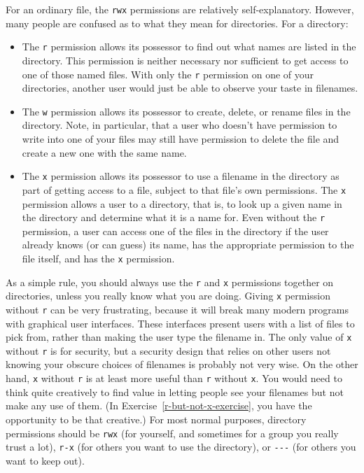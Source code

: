 For an ordinary file, the \texttt{rwx} permissions are relatively
self-explanatory.  However, many people are confused as to what they mean
for directories.  For a directory:
\begin{itemize}
\item
The \texttt{r} permission allows its possessor to find out what names are
listed in the directory.  This permission is neither necessary nor
sufficient to get access to one of those named files.  With only the \texttt{r}
permission on one of your directories, another user would just be able
to observe your taste in filenames.
\item
The \texttt{w} permission allows its possessor to create, delete, or rename
files in the directory.  Note, in particular, that a user who doesn't
have permission to write into one of your files may still have
permission to delete the file and create a new one with the same name.
\item
The \texttt{x} permission allows its possessor to use a filename in the
directory as part of getting access to a file, subject to that file's
own permissions.  The \texttt{x} permission allows a user to
 a directory, that is, to look up a given name in the
directory and determine what it is a name for.
Even without the \texttt{r}
permission, a user can access one of the files in
the directory if the user already knows (or can guess) its name, has the
appropriate permission to the file itself, and has the \texttt{x} permission.
\end{itemize}

As a simple rule, you should always use the \texttt{r} and \texttt{x} permissions
together on directories, unless you really know what you are doing.
Giving \texttt{x} permission without \texttt{r} can be very frustrating, because it will
break many modern programs with graphical user interfaces. These interfaces
present users with a list of files to pick from, rather than making
the user type the filename in.  The only value of \texttt{x} without \texttt{r} is for
security, but a security design that relies on other users not knowing
your obscure choices of filenames is probably not very wise.  On the
other hand, \texttt{x} without \texttt{r} is at least more useful than \texttt{r} without \texttt{x}.  You
would need to think quite creatively to find value in letting people
see your filenames but not make any use of them.  (In
Exercise~\ref{r-but-not-x-exercise}, you have the opportunity to be
that creative.)  For most normal
purposes, directory permissions should be \verb|rwx| (for yourself,
and sometimes for a group you really trust a lot), \verb|r-x| (for others you
want to use the directory), or \verb|---| (for others you want to keep
out).


